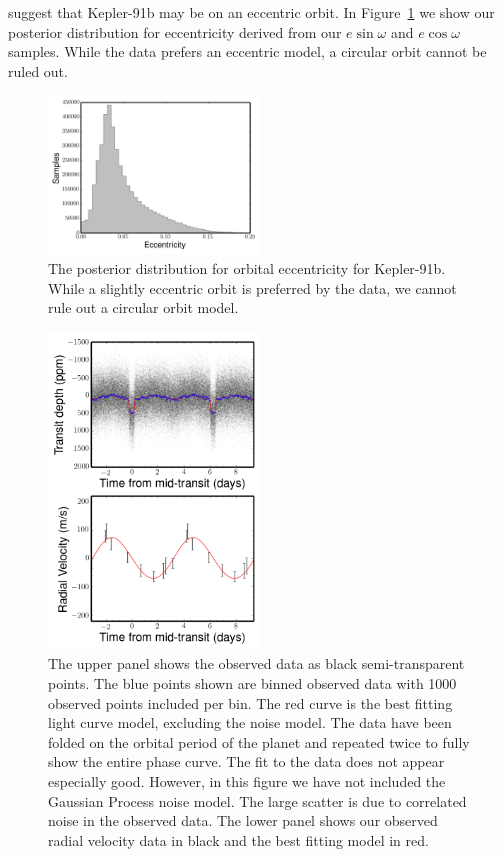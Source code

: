 \documentclass[apjl]{emulateapj}
\begin{document}
\citet{lillo14} suggest that Kepler-91b may be on an eccentric orbit. In Figure~\ref{fig:ecc} we show our posterior distribution for eccentricity derived from our $e\sin{\omega}$ and $e\cos{\omega}$ samples. While the data prefers an eccentric model, a circular orbit cannot be ruled out.

\begin{figure}
\includegraphics[width=0.50\textwidth]{ecc_hist.png}
\caption{The posterior distribution for orbital eccentricity for Kepler-91b. While a slightly eccentric orbit is preferred by the data, we cannot rule out a circular orbit model.}
\label{fig:ecc}
\end{figure}



\begin{figure}
\includegraphics[width=0.50\textwidth]{koi2133.png}
\caption{The upper panel shows the observed data as black semi-transparent points. The blue points shown are binned observed data with 1000 observed points included per bin. The red curve is the best fitting light curve model, excluding the noise model. The data have been folded on the orbital period of the planet and repeated twice to fully show the entire phase curve. The fit to the data does not appear especially good. However, in this figure we have not included the Gaussian Process noise model. The large scatter is due to correlated noise in the observed data. The lower panel shows our observed radial velocity data in black and the best fitting model in red.}
\label{fig:results}
\end{figure}
\end{document}
